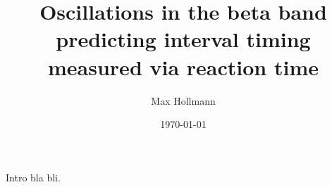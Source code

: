 \documentclass[man]{apa} %
\title{Oscillations in the beta band predicting interval timing measured via reaction time}
\author{Max Hollmann}
\affiliation{University of Groningen}
\date{\today}
\begin{document}
\maketitle
Intro bla bli.



\end{document}
